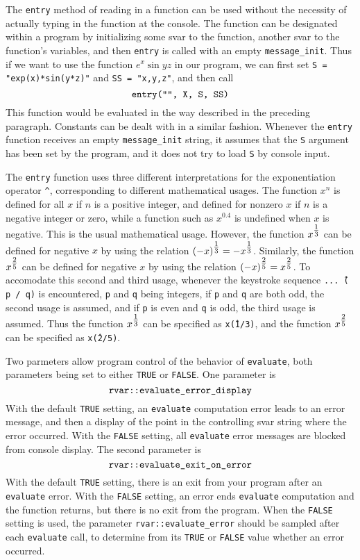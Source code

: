 The {\tt entry} method of reading in a function can be used
without the necessity of actually typing in the function at
the console. The function can be designated within a program by
initializing some svar to the function, another svar
to the function's variables, and then {\tt entry}
is called with an empty {\tt message\_init}. Thus if we want to use
the function $e^x\sin yz$ in our program, we can first set 
{\tt S = "exp(x)*sin(y*z)"} and {\tt SS = "x,y,z"}, and then call
$$\hbox{\tt entry("", X, S, SS)}$$
This function would be evaluated in the way described
in the preceding paragraph. Constants can be dealt with in a similar fashion.
Whenever the {\tt entry} function receives an empty {\tt message\_init} string,
it assumes that the {\tt S} argument has been set by the program, and it
does not try to load {\tt S} by console input. 

The {\tt entry} function uses three different interpretations
for the exponentiation operator {\tt \^}, corresponding to different
mathematical usages. The function $x^n$ is defined for all $x$ if
$n$ is a positive integer, and defined for nonzero $x$ if $n$ is a negative
integer or zero, while a function such as $x^{0.4}$ is
undefined when $x$ is negative. This is the usual mathematical usage.
However, the function $x^{\textstyle{\scriptstyle1\over\scriptstyle3}}$
can be defined for negative $x$ by using the relation
$(-x)^{\textstyle{\scriptstyle1\over\scriptstyle3}} = -x^{\textstyle{\scriptstyle1\over\scriptstyle3}}$.
Similarly, the function $x^{\textstyle{\scriptstyle2\over\scriptstyle5}}$ can be defined for negative $x$ by
using the relation $(-x)^{\textstyle{\scriptstyle2\over\scriptstyle5}} = x^{\textstyle{\scriptstyle2\over\scriptstyle5}}$. To accomodate this second
and third usage, whenever the keystroke sequence {\tt ...\^\ ( p / q)}
is encountered, {\tt p} and {\tt q} being integers, if {\tt p} and {\tt q}
are both odd, the second usage is assumed, and if {\tt p} is even and
{\tt q} is odd, the third usage is assumed. Thus the function $x^{\textstyle{\scriptstyle1\over\scriptstyle3}}$
can be specified as {\tt x\^(1/3)}, and the function $x^{\textstyle{\scriptstyle2\over\scriptstyle5}}$ can
be specified as {\tt x\^(2/5)}.

Two parmeters allow program control of the behavior of {\tt evaluate},
both parameters
being set to either {\tt TRUE} or {\tt FALSE}.  One parameter is
$$\hbox{\tt rvar::evaluate\_error\_display}$$
With the default {\tt TRUE} setting, an {\tt evaluate} computation error
leads to an error message, and then a display of 
the point in the controlling svar string where the error occurred.
With the {\tt FALSE} setting, all {\tt evaluate} error messages are blocked
from console display. The second parameter is
$$\hbox{\tt rvar::evaluate\_exit\_on\_error}$$
With the default {\tt TRUE} setting, there is an exit from your program
after an
{\tt evaluate} error. With the {\tt FALSE} setting, an error ends
{\tt evaluate} computation and the function returns,
but there is no exit from the program. 
When the {\tt FALSE} setting is used, the parameter {\tt rvar::evaluate\_error}
should be sampled after
each {\tt evaluate} call, to determine from its {\tt TRUE} or {\tt FALSE}
value whether an error occurred.

